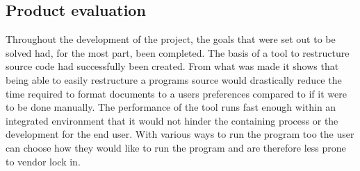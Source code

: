 
\subsection{Product evaluation}

Throughout the development of the project, the goals that were set out to be solved had, for the most part, been completed. The basis of a tool to restructure source code had successfully been created. From what was made it shows that being able to easily restructure a programs source would drastically reduce the time required to format documents to a users preferences compared to if it were to be done manually.
The performance of the tool runs fast enough within an integrated environment that it would not hinder the containing process or the development for the end user.
With various ways to run the program too the user can choose how they would like to run the program and are therefore less prone to vendor lock in.
